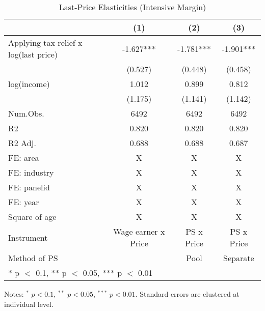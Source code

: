 \documentclass[
  11pt,
  a4paper,
]{article}
\begin{document}
\begin{table}

\caption{\label{tab:rob2intensive}Last-Price Elasticities (Intensive Margin)}
\centering
\fontsize{9}{11}\selectfont
\begin{threeparttable}
\begin{tabular}[t]{lccc}
\toprule
  & (1) & (2) & (3)\\
\midrule
Applying tax relief x log(last price) & -1.627*** & -1.781*** & -1.901***\\
 & (0.527) & (0.448) & (0.458)\\
log(income) & 1.012 & 0.899 & 0.812\\
 & (1.175) & (1.141) & (1.142)\\
\midrule
Num.Obs. & 6492 & 6492 & 6492\\
R2 & 0.820 & 0.820 & 0.820\\
R2 Adj. & 0.688 & 0.688 & 0.687\\
FE: area & X & X & X\\
FE: industry & X & X & X\\
FE: panelid & X & X & X\\
FE: year & X & X & X\\
Square of age & X & X & X\\
Instrument & Wage earner x Price & PS x Price & PS x Price\\
Method of PS &  & Pool & Separate\\
\bottomrule
\multicolumn{4}{l}{\rule{0pt}{1em}* p $<$ 0.1, ** p $<$ 0.05, *** p $<$ 0.01}\\
\end{tabular}
\begin{tablenotes}
\item Notes: $^{*}$ $p < 0.1$, $^{**}$ $p < 0.05$, $^{***}$ $p < 0.01$. Standard errors are clustered at individual level.
\end{tablenotes}
\end{threeparttable}
\end{table}
\end{document}
